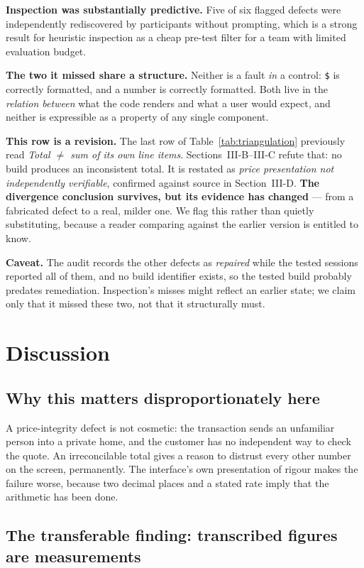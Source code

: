 \documentclass[conference]{IEEEtran}
\begin{document}
\textbf{Inspection was substantially predictive.} Five of six flagged defects were independently
rediscovered by participants without prompting, which is a strong result for heuristic inspection as a
cheap pre-test filter for a team with limited evaluation budget.

\textbf{The two it missed share a structure.} Neither is a fault \emph{in} a control: \texttt{\$} is
correctly formatted, and a number is correctly formatted. Both live in the \emph{relation between}
what the code renders and what a user would expect, and neither is expressible as a property of any
single component.

\textbf{This row is a revision.} The last row of Table~\ref{tab:triangulation} previously read \emph{Total
$\neq$ sum of its own line items}. Sections~III-B--III-C refute that: no build produces an
inconsistent total. It is restated as \emph{price presentation not independently verifiable},
confirmed against source in Section~III-D. \textbf{The divergence conclusion survives, but its
evidence has changed} --- from a fabricated defect to a real, milder one. We flag this rather than
quietly substituting, because a reader comparing against the earlier version is entitled to know.

\textbf{Caveat.} The audit records the other defects as \emph{repaired} while the tested sessions
reported all of them, and no build identifier exists, so the tested build probably predates
remediation. Inspection's misses might reflect an earlier state; we claim only that it missed these
two, not that it structurally must.

\section{Discussion}

\subsection{Why this matters disproportionately here}

A price-integrity defect is not cosmetic: the transaction sends an unfamiliar person into a private
home, and the customer has no independent way to check the quote. An irreconcilable total gives a
reason to distrust every other number on the screen, permanently. The interface's own presentation of
rigour makes the failure worse, because two decimal places and a stated rate imply that the arithmetic
has been done.

\subsection{The transferable finding: transcribed figures are measurements}
\end{document}
